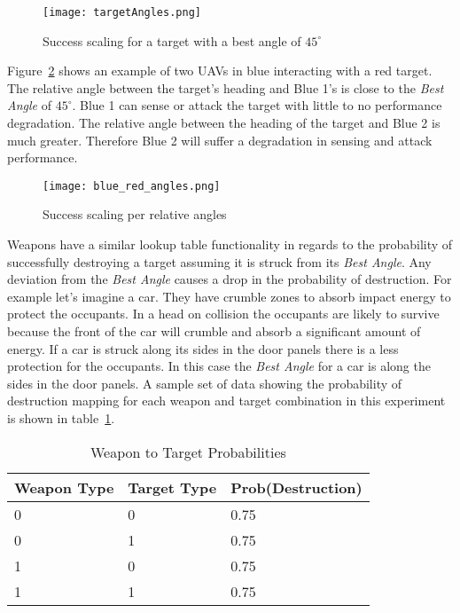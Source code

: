 
\begin{figure}[H]
	\centering
	\texttt{[image: targetAngles.png]}
	\caption{Success scaling for a target with a best angle of $45^{\circ}$}
	\label{fig:targetAngles}
\end{figure}

Figure~\ref{fig:blue_red_angles} shows an example of two UAVs in blue interacting with a red target.  The relative angle between the target's heading and Blue 1's is close to the \textit{Best Angle} of $45^{\circ}$.  Blue 1 can sense or attack the target with little to no performance degradation.  The relative angle between the heading of the target and Blue 2 is much greater.  Therefore Blue 2 will suffer a degradation in sensing and attack performance.

\begin{figure}[H]
	\centering
	\texttt{[image: blue\_red\_angles.png]}
	\caption{Success scaling per relative angles}
	\label{fig:blue_red_angles}
\end{figure}


Weapons have a similar lookup table functionality in regards to the probability of successfully destroying a target assuming it is struck from its \textit{Best Angle}.  Any deviation from the \textit{Best Angle} causes a drop in the probability of destruction.  For example let's imagine a car.  They have crumble zones to absorb impact energy to protect the occupants.  In a head on collision the occupants are likely to survive because the front of the car will crumble and absorb a significant amount of energy.  If a car is struck along its sides in the door panels there is a less protection for the occupants.  In this case the \textit{Best Angle} for a car is along the sides in the door panels. A sample set of data showing the probability of destruction mapping for each weapon and target combination in this experiment is shown in table~\ref{tab:wpnTgtProb}.

\begin{table}[H]
	\caption{Weapon to Target Probabilities}
	\centering
	\label{tab:wpnTgtProb}
	\begin{tabular}{|p{1.5cm}|p{1.5cm}|p{3cm}|}
		\hline
		Weapon Type & Target Type & Prob(Destruction)\\ \hline
		0 & 0 & 0.75 \\
		0 & 1 & 0.75 \\
		1 & 0 & 0.75 \\
		1 & 1 & 0.75 \\
		\hline
	\end{tabular}
\end{table}



